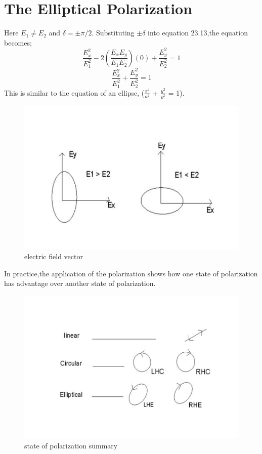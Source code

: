 \section{The Elliptical Polarization}
Here $E_1\neq E_2$ and $\delta = \pm \pi/2 $. Substituting $\pm \delta$ into equation 23.13,the equation becomes;
\begin{equation}
\frac{E_{x}^2}{E_{1}^2} -2(\frac{E_{x}E_{y}}{E_{1}E_{2}})(0) + \frac{E_{y}^2}{E_{2}^2} = 1
\end{equation}
\begin{equation}
\frac{E_{x}^2}{E_{1}^2} + \frac{E_{y}^2}{E_{2}^2} = 1
\end{equation}
This is similar to the equation of an ellipse, ($\frac{x^2}{a^2}$ + $\frac{y^2}{b^2}$ = 1).
\begin{figure}[h]
\centering
\includegraphics[width=.8\linewidth]{./graphics/eeee}
\caption{electric field vector}
\end{figure}

In practice,the application of the polarization shows how one state of polarization has advantage over another state of polarization.
\begin{figure}[h]
\centering
\includegraphics[width=.8\linewidth]{./graphics/eee}
\caption{state of polarization summary}
\end{figure}

